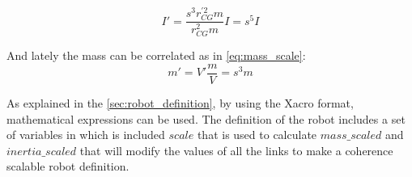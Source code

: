 \begin{equation}
\label{eq:inertia_scale}
  I' = \frac{s^{3} r_{CG}^{'2} m}{r_{CG}^{2} m} I = s^{5} I
\end{equation}

And lately the mass can be correlated as in \ref{eq:mass_scale}:
\begin{equation}
\label{eq:mass_scale}
  m' = V' \frac{m}{V} = s^{3}m
\end{equation}

As explained in the \ref{sec:robot_definition}, by using the Xacro format, mathematical expressions can be used.
The definition of the robot includes a set of variables in which is included $scale$ that is used to calculate $mass\_scaled$ and $inertia\_scaled$ that will modify the values of all the links to make a coherence scalable robot definition.


